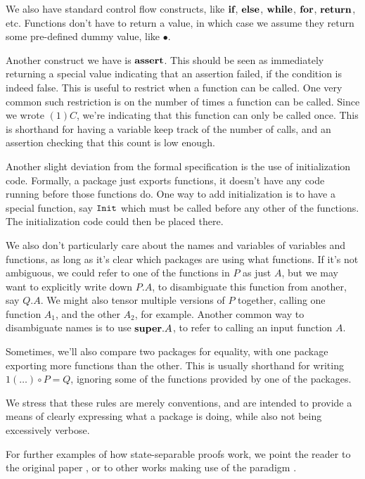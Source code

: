 We also have standard control flow constructs, like $\textbf{if}$,
$\textbf{else}$, $\textbf{while}$, $\textbf{for}$, $\textbf{return}$, etc.
Functions don't have to return a value,
in which case we assume they return some pre-defined dummy
value, like $\bullet$.

Another construct we have is $\textbf{assert}$.
This should be seen as immediately returning a special value
indicating that an assertion failed, if the condition is indeed
false.
This is useful to restrict when a function can be called.
One very common such restriction is on the number of times
a function can be called.
Since we wrote $(1)C$, we're indicating that this function
can only be called once.
This is shorthand for having a variable keep track of the number
of calls, and an assertion checking that this count is low
enough.

Another slight deviation from the formal specification is the use
of initialization code.
Formally, a package just exports functions,
it doesn't have any code running before those functions do.
One way to add initialization is to have a special function,
say $\texttt{Init}$ which must be called before any other of the functions.
The initialization code could then be placed there.

We also don't particularly care about the names and variables
of variables and functions, as long as it's clear which packages
are using what functions.
If it's not ambiguous, we could refer to one of the functions
in $P$ as just $A$,
but we may want to explicitly write down $P.A$, to disambiguate this
function from another, say $Q.A$.
We might also tensor multiple versions of $P$ together,
calling one function $A_1$, and the other $A_2$, for example.
Another common way to disambiguate names is
to use $\textbf{super}.A$, to refer to calling an input function $A$.

Sometimes, we'll also compare two packages for equality,
with one package exporting more functions than the other.
This is usually shorthand for writing $1(\ldots) \circ P = Q$,
ignoring some of the functions provided by one of the packages.

We stress that these rules are merely conventions,
and are intended to provide a means of clearly expressing
what a package is doing, while also not being excessively verbose.

For further examples of how state-separable proofs work,
we point the reader to the original paper
\cite{AC:BDFKK18}, or
to other works making use of the paradigm
\cite{joyofcryptography, mei22}.
